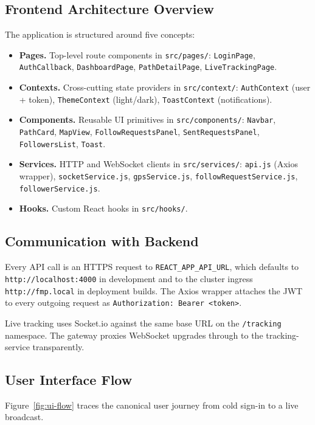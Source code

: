 \documentclass[11pt,a4paper]{article}
\begin{document}
\subsection{Frontend Architecture Overview}
The application is structured around five concepts:

\begin{itemize}[leftmargin=*]
  \item \textbf{Pages.}  Top-level route components in
        \texttt{src/pages/}: \texttt{LoginPage},
        \texttt{AuthCallback}, \texttt{DashboardPage},
        \texttt{PathDetailPage}, \texttt{LiveTrackingPage}.
  \item \textbf{Contexts.}  Cross-cutting state providers in
        \texttt{src/context/}: \texttt{AuthContext} (user + token),
        \texttt{ThemeContext} (light/dark), \texttt{ToastContext}
        (notifications).
  \item \textbf{Components.}  Reusable UI primitives in
        \texttt{src/components/}: \texttt{Navbar},
        \texttt{PathCard}, \texttt{MapView},
        \texttt{FollowRequestsPanel}, \texttt{SentRequestsPanel},
        \texttt{FollowersList}, \texttt{Toast}.
  \item \textbf{Services.}  HTTP and WebSocket clients in
        \texttt{src/services/}: \texttt{api.js} (Axios wrapper),
        \texttt{socketService.js},
        \texttt{gpsService.js},
        \texttt{followRequestService.js},
        \texttt{followerService.js}.
  \item \textbf{Hooks.}  Custom React hooks in \texttt{src/hooks/}.
\end{itemize}

\subsection{Communication with Backend}
Every API call is an HTTPS request to \texttt{REACT\_APP\_API\_URL},
which defaults to \texttt{http://localhost:4000} in development and to
the cluster ingress \texttt{http://fmp.local} in deployment builds.
The Axios wrapper attaches the JWT to every outgoing request as
\texttt{Authorization: Bearer <token>}.

Live tracking uses Socket.io against the same base URL on the
\texttt{/tracking} namespace.  The gateway proxies WebSocket upgrades
through to the tracking-service transparently.

\subsection{User Interface Flow}
Figure~\ref{fig:ui-flow} traces the canonical user journey from cold
sign-in to a live broadcast.
\end{document}
